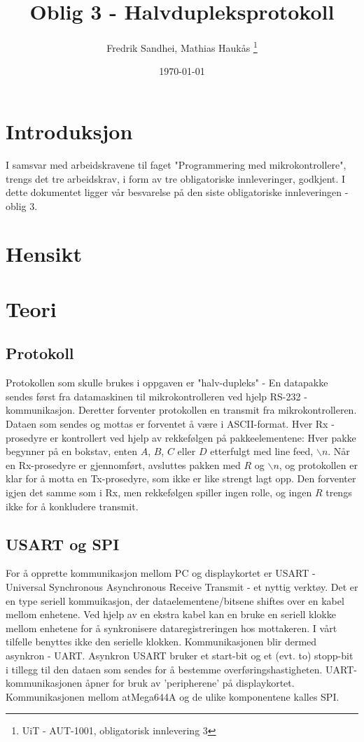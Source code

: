 \documentclass[11pt, a4paper]{report}
\begin{document}
\title{Oblig 3 - Halvdupleksprotokoll}
\author{Fredrik Sandhei, Mathias Haukås \thanks{UiT - AUT-1001, obligatorisk innlevering 3}}
\date{\today}
\maketitle
\newpage
\tableofcontents
\newpage

\section{Introduksjon}
I samsvar med arbeidskravene til faget "Programmering med mikrokontrollere", trengs det tre arbeidskrav, i form av tre obligatoriske innleveringer, godkjent. I dette dokumentet ligger vår besvarelse på den siste obligatoriske innleveringen - oblig 3. 

\section{Hensikt}

\section{Teori}

\subsection{Protokoll}
Protokollen som skulle brukes i oppgaven er "halv-dupleks" - En datapakke sendes først fra datamaskinen til mikrokontrolleren ved hjelp RS-232 - kommunikasjon. Deretter forventer protokollen en transmit fra mikrokontrolleren. Dataen som sendes og mottas er forventet å være i ASCII-format. Hver Rx - prosedyre er kontrollert ved hjelp av rekkefølgen på pakkeelementene: Hver pakke begynner på en bokstav, enten $A$, $B$, $C$ eller $D$ etterfulgt med line feed, $\backslash n$. Når en Rx-prosedyre er gjennomført, avsluttes pakken med $R$ og $\backslash n$, og protokollen er klar for å motta en Tx-prosedyre, som ikke er like strengt lagt opp. Den forventer igjen det samme som i Rx, men rekkefølgen spiller ingen rolle, og ingen $R$ trengs ikke for å konkludere transmit. 

\subsection{USART og SPI}
For å opprette kommunikasjon mellom PC og displaykortet er USART - Universal Synchronous Asynchronous Receive Transmit - et nyttig verktøy. Det er en type seriell kommuikasjon, der dataelementene/bitsene shiftes over en kabel mellom enhetene. Ved hjelp av en ekstra kabel kan en bruke en seriell klokke mellom enhetene for å synkronisere dataregistreringen hos mottakeren. I vårt tilfelle benyttes ikke den serielle klokken. Kommunikasjonen blir dermed asynkron - UART. Asynkron USART bruker et start-bit og et (evt. to) stopp-bit i tillegg til den dataen som sendes for å bestemme overføringshastigheten. UART-kommunikasjonen åpner for bruk av 'peripherene' på displaykortet. Kommunikasjonen mellom atMega644A og de ulike komponentene kalles SPI. %
\end{document}
